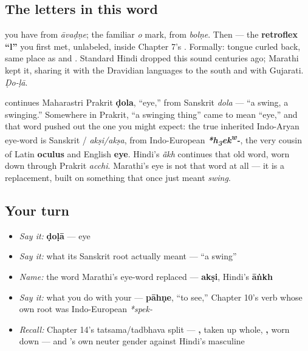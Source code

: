 \subsection*{The letters in this word}
\textbf{} you have from \emph{āvaḍṇe}; \textbf{} the familiar \emph{o} mark, from \emph{bolṇe}. Then \textbf{} — the \textbf{retroflex \textquotedblleft{}l\textquotedblright{}} you first met, unlabeled, inside Chapter 7's \textbf{}. Formally: tongue curled back, same place as \textbf{} and \textbf{}. Standard Hindi dropped this sound centuries ago; Marathi kept it, sharing it with the Dravidian languages to the south and with Gujarati. \emph{Ḍo-ḷā}.

\begin{cousinweb}
\textbf{} continues Maharastri Prakrit \textbf{ḍola}, \textquotedblleft{}eye,\textquotedblright{} from Sanskrit \textbf{} \emph{dola} — \textquotedblleft{}a swing, a swinging.\textquotedblright{} Somewhere in Prakrit, \textquotedblleft{}a swinging thing\textquotedblright{} came to mean \textquotedblleft{}eye,\textquotedblright{} and that word pushed out the one you might expect: the true inherited Indo-Aryan eye-word is Sanskrit \textbf{}/\textbf{} \emph{akṣi/akṣa}, from Indo-European \emph{\textbf{*h\textsubscript{3}ek\textsuperscript{w}-}}, the very cousin of Latin \textbf{oculus} and English \textbf{eye}. Hindi's \textbf{} \emph{ā̃kh} continues that old word, worn down through Prakrit \emph{acchi}. Marathi's eye is not that word at all — it is a replacement, built on something that once just meant \emph{swing}.
\end{cousinweb}

\subsection*{Your turn}
\begin{itemize}
\raggedright
  \item \emph{Say it:} \textbf{ḍoḷā} — eye
  \item \emph{Say it:} what its Sanskrit root actually meant — \textquotedblleft{}a swing\textquotedblright{}
  \item \emph{Name:} the word Marathi's eye-word replaced — \textbf{akṣi}, Hindi's \textbf{āṅkh}
  \item \emph{Say it:} what you do with your \textbf{} — \textbf{pāhṇe}, \textquotedblleft{}to see,\textquotedblright{} Chapter 10's verb whose own root was Indo-European \emph{*spek-}
  \item \emph{Recall:} Chapter 14's tatsama/tadbhava split — \textbf{, } taken up whole, \textbf{, } worn down — and \textbf{}'s own neuter gender against Hindi's masculine
\end{itemize}

